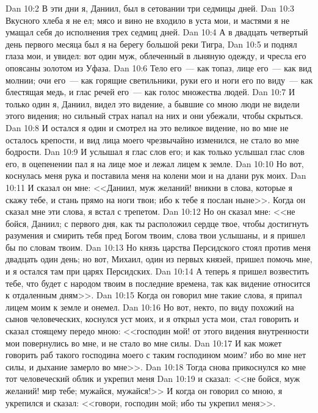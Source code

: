 \vs Dan 10:2 В эти дни я, Даниил, был в сетовании три седмицы дней.
\vs Dan 10:3 Вкусного хлеба я не ел; мясо и вино не входило в уста мои, и мастями я не умащал себя до исполнения трех седмиц дней.
\vs Dan 10:4 А в двадцать четвертый день первого месяца был я на берегу большой реки Тигра,
\vs Dan 10:5 и поднял глаза мои, и увидел: вот один муж, облеченный в льняную одежду, и чресла его опоясаны золотом из Уфаза.
\vs Dan 10:6 Тело его~--- как топаз, лице его~--- как вид молнии; очи его~--- как горящие светильники, руки его и ноги его по виду~--- как блестящая медь, и глас речей его~--- как голос множества людей.
\vs Dan 10:7 И только один я, Даниил, видел это видение, а бывшие со мною люди не видели этого видения; но сильный страх напал на них и они убежали, чтобы скрыться.
\vs Dan 10:8 И остался я один и смотрел на это великое видение, но во мне не осталось крепости, и вид лица моего чрезвычайно изменился, не стало во мне бодрости.
\vs Dan 10:9 И услышал я глас слов его; и как только услышал глас слов его, в оцепенении пал я на лице мое и лежал лицем к земле.
\vs Dan 10:10 Но вот, коснулась меня рука и поставила меня на колени мои и на длани рук моих.
\vs Dan 10:11 И сказал он мне: <<Даниил, муж желаний! вникни в слова, которые я скажу тебе, и стань прямо на ноги твои; ибо к тебе я послан ныне>>. Когда он сказал мне эти слова, я встал с трепетом.
\vs Dan 10:12 Но он сказал мне: <<не бойся, Даниил; с первого дня, как ты расположил сердце твое, чтобы достигнуть разумения и смирить тебя пред Богом твоим, слова твои услышаны, и я пришел бы по словам твоим.
\vs Dan 10:13 Но князь царства Персидского стоял против меня двадцать один день; но вот, Михаил, один из первых князей, пришел помочь мне, и я остался там при царях Персидских.
\vs Dan 10:14 А теперь я пришел возвестить тебе, что будет с народом твоим в последние времена, так как видение относится к отдаленным дням>>.
\vs Dan 10:15 Когда он говорил мне такие слова, я припал лицем моим к земле и онемел.
\vs Dan 10:16 Но вот, некто, по виду похожий на сынов человеческих, коснулся уст моих, и я открыл уста мои, стал говорить и сказал стоящему передо мною: <<господин мой! от этого видения внутренности мои повернулись во мне, и не стало во мне силы.
\vs Dan 10:17 И как может говорить раб такого господина моего с таким господином моим? ибо во мне нет силы, и дыхание замерло во мне>>.
\vs Dan 10:18 Тогда снова прикоснулся ко мне тот человеческий облик и укрепил меня
\vs Dan 10:19 и сказал: <<не бойся, муж желаний! мир тебе; мужайся, мужайся!>> И когда он говорил со мною, я укрепился и сказал: <<говори, господин мой; ибо ты укрепил меня>>.
